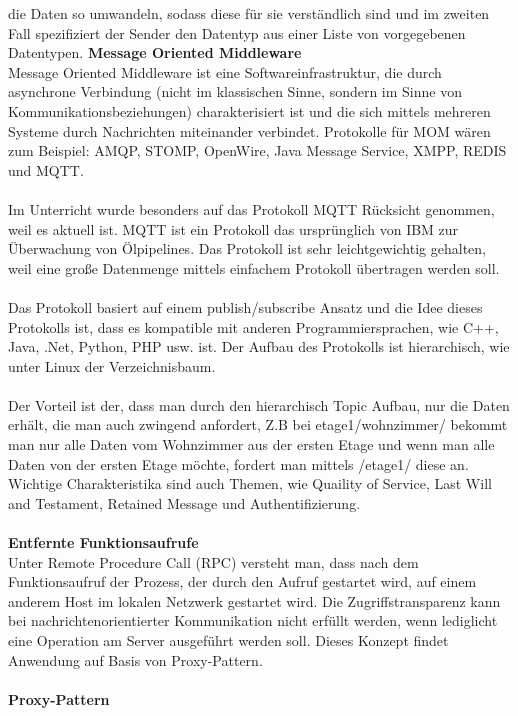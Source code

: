 \documentclass[a4paper,12pt]{article}
\begin{document}
die Daten so umwandeln, sodass diese für sie verständlich sind und im zweiten Fall spezifiziert der Sender den Datentyp aus einer Liste von vorgegebenen Datentypen.
\cite{communication1}
\newpage
\noindent
\textbf{Message Oriented Middleware\\}
Message Oriented Middleware ist eine Softwareinfrastruktur, die durch asynchrone Verbindung (nicht im klassischen Sinne, sondern im Sinne von Kommunikationsbeziehungen) charakterisiert ist und die sich mittels mehreren Systeme durch Nachrichten miteinander verbindet. Protokolle für MOM wären zum Beispiel: 
AMQP, STOMP, OpenWire, Java Message Service, XMPP, REDIS und MQTT.\\\\Im Unterricht wurde besonders auf das Protokoll MQTT Rücksicht genommen, weil es aktuell ist. MQTT ist ein Protokoll das ursprünglich von IBM zur Überwachung von Ölpipelines. Das Protokoll ist sehr leichtgewichtig gehalten, weil eine große Datenmenge
mittels einfachem Protokoll übertragen werden soll. \\\\
Das Protokoll basiert auf einem publish/subscribe Ansatz und die Idee dieses Protokolls ist, dass es kompatible mit anderen Programmiersprachen, wie C++, Java, .Net, Python, PHP usw. ist. Der Aufbau des Protokolls ist hierarchisch, wie unter Linux der Verzeichnisbaum. \\\\Der Vorteil ist der, dass man durch den hierarchisch Topic Aufbau, nur die 
Daten erhält, die man auch zwingend anfordert, Z.B bei etage1/wohnzimmer/ bekommt man nur alle Daten vom Wohnzimmer aus der ersten Etage und wenn man alle Daten von der ersten Etage möchte, fordert man mittels /etage1/ diese an. Wichtige Charakteristika sind auch Themen, wie Quaility of Service, Last Will and Testament, Retained Message und Authentifizierung.\\
\\
\textbf{Entfernte Funktionsaufrufe}\\
Unter Remote Procedure Call (RPC) versteht man, dass nach dem Funktionsaufruf der Prozess, der durch den Aufruf gestartet wird, auf einem anderem Host im lokalen Netzwerk gestartet wird. Die Zugriffstransparenz kann bei nachrichtenorientierter Kommunikation nicht erfüllt werden, wenn lediglicht eine Operation am Server ausgeführt werden soll. Dieses Konzept findet Anwendung auf Basis von Proxy-Pattern.\\\\
\newpage
\noindent
\textbf{Proxy-Pattern}\\
\end{document}
